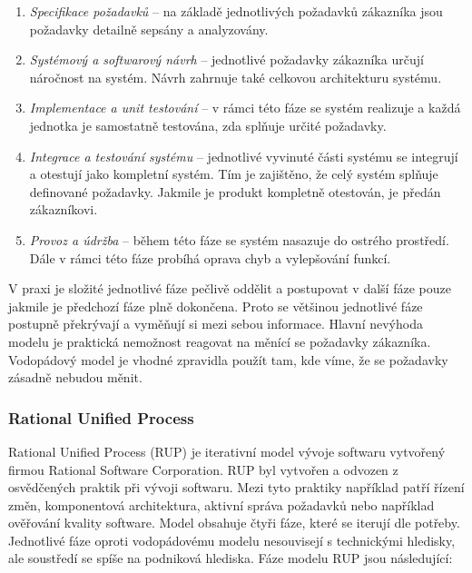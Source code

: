 \documentclass[czech,master,public,dept460,male,cpdeclaration,oneside]{diploma}
\begin{document}
\begin{enumerate}
\item \textit{Specifikace požadavků} -- na základě jednotlivých požadavků zákazníka jsou požadavky detailně sepsány a analyzovány.

\item \textit{Systémový a softwarový návrh} -- jednotlivé požadavky zákazníka určují náročnost na systém. Návrh zahrnuje také celkovou architekturu systému. 

\item \textit{Implementace a unit testování} -- v rámci této fáze se systém realizuje a každá jednotka je samostatně testována, zda splňuje určité požadavky.

\item \textit{Integrace a testování systému} -- jednotlivé vyvinuté části systému se integrují a otestují jako kompletní systém. Tím je zajištěno, že celý systém splňuje definované požadavky. Jakmile je produkt kompletně otestován, je předán zákazníkovi.

\item \textit{Provoz a údržba} -- během této fáze se systém nasazuje do ostrého prostředí. Dále v rámci této fáze probíhá oprava chyb a vylepšování funkcí.

\end{enumerate}

V praxi je složité jednotlivé fáze pečlivě oddělit a postupovat v další fáze pouze jakmile je předchozí fáze plně dokončena. Proto se většinou jednotlivé fáze postupně překrývají a vyměňují si mezi sebou informace. Hlavní nevýhoda modelu je praktická nemožnost reagovat na měnící se požadavky zákazníka. Vodopádový model je vhodné zpravidla použít tam, kde víme, že se požadavky zásadně nebudou měnit.

\subsubsection{Rational Unified Process}
Rational Unified Process (RUP) je iterativní model vývoje softwaru vytvořený firmou Rational Software Corporation. RUP byl vytvořen a odvozen z osvědčených praktik při vývoji softwaru. Mezi tyto praktiky například patří řízení změn, komponentová architektura, aktivní správa požadavků nebo například ověřování kvality software. Model obsahuje čtyři fáze, které se iterují dle potřeby. Jednotlivé fáze oproti vodopádovému modelu nesouvisejí s technickými hledisky, ale soustředí se spíše na podniková hlediska. \cite{ref:rup_ibm_about} Fáze modelu RUP jsou následující:
\end{document}
